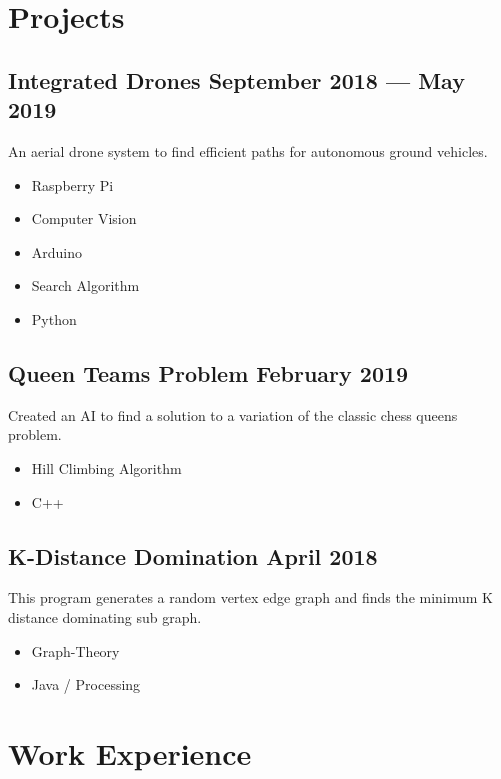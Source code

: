 \documentclass[11pt, a4paper]{article}
\begin{document}
\section{Projects}
\subsection{Integrated Drones \hfill September 2018 --- May 2019}
An aerial drone system to find efficient paths for autonomous ground vehicles.
\begin{multicols}{2}
	\begin{itemize}
		\item Raspberry Pi
		\item Computer Vision
		\item Arduino
		\item Search Algorithm
		\item Python
	\end{itemize}
\end{multicols}
\subsection{Queen Teams Problem \hfill February 2019}
Created an AI to find a solution to a variation of the classic chess queens problem.
\begin{multicols}{2}
	\begin{itemize}
		\item Hill Climbing Algorithm
		\item C++
	\end{itemize}
\end{multicols}
\subsection{K-Distance Domination \hfill April 2018}
\justify
This program generates a random vertex edge graph and finds the minimum K distance dominating sub graph.
\begin{multicols}{2}
	\begin{itemize}
		\item Graph-Theory
		\item Java / Processing
	\end{itemize}
\end{multicols}
\pagebreak
\section{Work Experience}
\end{document}
